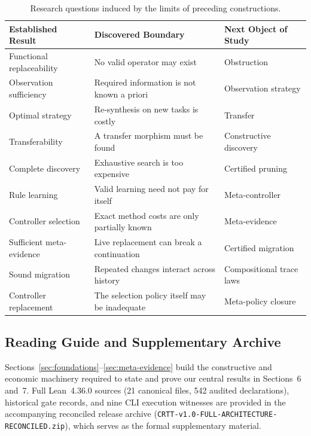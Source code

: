 \begin{table}[h]
\centering
\footnotesize
\begin{tabular}{@{}p{3.6cm}p{5.2cm}p{4.6cm}@{}}
\toprule
\textbf{Established Result} & \textbf{Discovered Boundary} & \textbf{Next Object of Study} \\
\midrule
Functional replaceability & No valid operator may exist & Obstruction \\
Observation sufficiency & Required information is not known a priori & Observation strategy \\
Optimal strategy & Re-synthesis on new tasks is costly & Transfer \\
Transferability & A transfer morphism must be found & Constructive discovery \\
Complete discovery & Exhaustive search is too expensive & Certified pruning \\
Rule learning & Valid learning need not pay for itself & Meta-controller \\
Controller selection & Exact method costs are only partially known & Meta-evidence \\
Sufficient meta-evidence & Live replacement can break a continuation & Certified migration \\
Sound migration & Repeated changes interact across history & Compositional trace laws \\
Controller replacement & The selection policy itself may be inadequate & Meta-policy closure \\
\bottomrule
\end{tabular}
\caption{Research questions induced by the limits of preceding constructions.}
\label{tab:genesis}
\end{table}

\subsection{Reading Guide and Supplementary Archive}
Sections~\ref{sec:foundations}--\ref{sec:meta-evidence} build the constructive and economic machinery required to state and prove our central results in Sections~6 and~7. Full Lean~4.36.0 sources (21 canonical files, 542 audited declarations), historical gate records, and nine CLI execution witnesses are provided in the accompanying reconciled release archive (\texttt{CRTT-v1.0-FULL-ARCHITECTURE-RECONCILED.zip}), which serves as the formal supplementary material.

